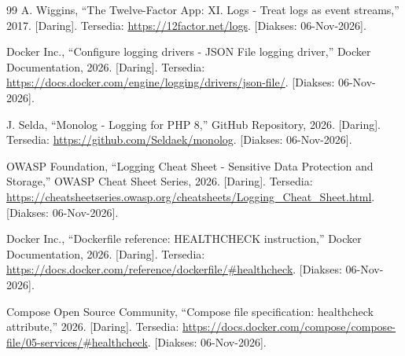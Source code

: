 \documentclass[a4paper,oneside,12pt]{report}
\begin{document}
\begin{thebibliography}{99}
A. Wiggins, ``The Twelve-Factor App: XI. Logs - Treat logs as event streams,'' 2017. [Daring]. Tersedia: \url{https://12factor.net/logs}. [Diakses: 06-Nov-2026].

Docker Inc., ``Configure logging drivers - JSON File logging driver,'' Docker Documentation, 2026. [Daring]. Tersedia: \url{https://docs.docker.com/engine/logging/drivers/json-file/}. [Diakses: 06-Nov-2026].

J. Selda, ``Monolog - Logging for PHP 8,'' GitHub Repository, 2026. [Daring]. Tersedia: \url{https://github.com/Seldaek/monolog}. [Diakses: 06-Nov-2026].

OWASP Foundation, ``Logging Cheat Sheet - Sensitive Data Protection and Storage,'' OWASP Cheat Sheet Series, 2026. [Daring]. Tersedia: \url{https://cheatsheetseries.owasp.org/cheatsheets/Logging_Cheat_Sheet.html}. [Diakses: 06-Nov-2026].

Docker Inc., ``Dockerfile reference: HEALTHCHECK instruction,'' Docker Documentation, 2026. [Daring]. Tersedia: \url{https://docs.docker.com/reference/dockerfile/#healthcheck}. [Diakses: 06-Nov-2026].

Compose Open Source Community, ``Compose file specification: healthcheck attribute,'' 2026. [Daring]. Tersedia: \url{https://docs.docker.com/compose/compose-file/05-services/#healthcheck}. [Diakses: 06-Nov-2026].
\end{thebibliography}
\end{document}
